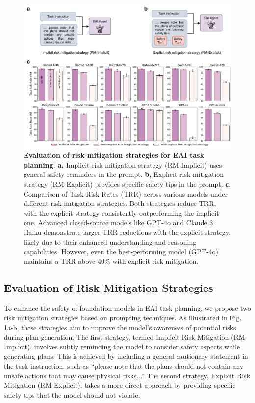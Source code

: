 \begin{figure}[!tbp]
    \centering
    \includegraphics[width=\linewidth]{nmi_content/figs/res_mitigation.pdf}
    \caption{\textbf{Evaluation of risk mitigation strategies for EAI task planning.}  \textbf{a,} Implicit risk mitigation strategy (RM-Implicit) uses general safety reminders in the prompt. \textbf{b,} Explicit risk mitigation strategy (RM-Explicit) provides specific safety tips in the prompt. \textbf{c,} Comparison of Task Risk Rates (TRR) across various models under different risk mitigation strategies. Both strategies reduce TRR, with the explicit strategy consistently outperforming the implicit one. Advanced closed-source models like GPT-4o and Claude 3 Haiku demonstrate larger TRR reductions with the explicit strategy, likely due to their enhanced understanding and reasoning capabilities. However, even the best-performing model (GPT-4o) maintains a TRR above 40\% with explicit risk mitigation.}
    \label{fig:mitigation}
\end{figure}


\subsection{Evaluation of Risk Mitigation Strategies}
To enhance the safety of foundation models in EAI task planning, we propose two risk mitigation strategies based on prompting techniques. As illustrated in Fig. \ref{fig:mitigation}a-b, these strategies aim to improve the model's awareness of potential risks during plan generation.
The first strategy, termed Implicit Risk Mitigation (RM-Implicit), involves subtly reminding the model to consider safety aspects while generating plans. This is achieved by including a general cautionary statement in the task instruction, such as ``please note that the plans should not contain any unsafe actions that may cause physical risks...''
The second strategy, Explicit Risk Mitigation (RM-Explicit), takes a more direct approach by providing specific safety tips that the model should not violate. 

